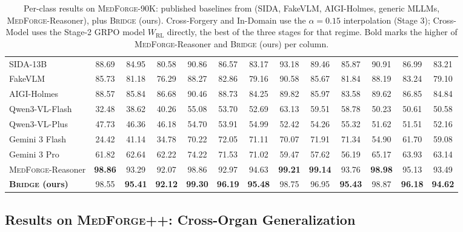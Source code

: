 \documentclass[10pt,twocolumn,letterpaper]{article}
\newcommand{\bridge}{\textsc{Bridge}}
\newcommand{\medforge}{\textsc{MedForge}}
\newcommand{\medforgepp}{\textsc{MedForge++}}
\begin{document}
\begin{table}[t]
{\begin{tabular}{lcccccccccccc}
SIDA-13B~\cite{sida2025} & 88.69 & 84.95 & 80.58 & 90.86 & 86.57 & 83.17 & 93.18 & 89.46 & 85.87 & 90.91 & 86.99 & 83.21 \\
FakeVLM & 85.73 & 81.18 & 76.29 & 88.27 & 82.86 & 79.16 & 90.58 & 85.67 & 81.84 & 88.19 & 83.24 & 79.10 \\
AIGI-Holmes & 88.57 & 85.84 & 86.68 & 90.46 & 88.73 & 84.25 & 89.82 & 85.97 & 83.58 & 89.62 & 86.85 & 84.84 \\
Qwen3-VL-Flash & 32.48 & 38.62 & 40.26 & 55.08 & 53.70 & 52.69 & 63.13 & 59.51 & 58.78 & 50.23 & 50.61 & 50.58 \\
Qwen3-VL-Plus & 47.73 & 46.36 & 46.18 & 54.70 & 53.91 & 54.99 & 52.42 & 54.26 & 55.32 & 51.62 & 51.51 & 52.16 \\
Gemini 3 Flash & 24.42 & 41.14 & 34.78 & 70.22 & 72.05 & 71.11 & 70.07 & 71.91 & 71.34 & 54.90 & 61.70 & 59.08 \\
Gemini 3 Pro & 61.82 & 62.64 & 62.22 & 74.22 & 71.53 & 71.02 & 59.47 & 57.62 & 56.19 & 65.17 & 63.93 & 63.14 \\
\medforge{}-Reasoner & \textbf{98.86} & 93.29 & 92.07 & 98.86 & 92.97 & 94.63 & \textbf{99.21} & \textbf{99.14} & 93.76 & \textbf{98.98} & 95.13 & 93.49 \\
\textbf{\bridge{} (ours)} & 98.55 & \textbf{95.41} & \textbf{92.12} & \textbf{99.30} & \textbf{96.19} & \textbf{95.48} & 98.75 & 96.95 & \textbf{95.43} & 98.87 & \textbf{96.18} & \textbf{94.62} \\
\bottomrule
\end{tabular}%
}
\caption{Per-class results on \medforge{}-90K: published baselines from \citet{medforge2026} (SIDA, FakeVLM, AIGI-Holmes, generic MLLMs, \medforge{}-Reasoner), plus \bridge{} (ours). Cross-Forgery and In-Domain use the $\alpha{=}0.15$ interpolation (Stage 3); Cross-Model uses the Stage-2 GRPO model $W_{\mathrm{RL}}$ directly, the best of the three stages for that regime. Bold marks the higher of \medforge{}-Reasoner and \bridge{} (ours) per column.}
\label{tab:published-full}
\end{table}

\subsection{Results on \medforgepp{}: Cross-Organ Generalization}
\label{sec:mfpp}
\end{document}
